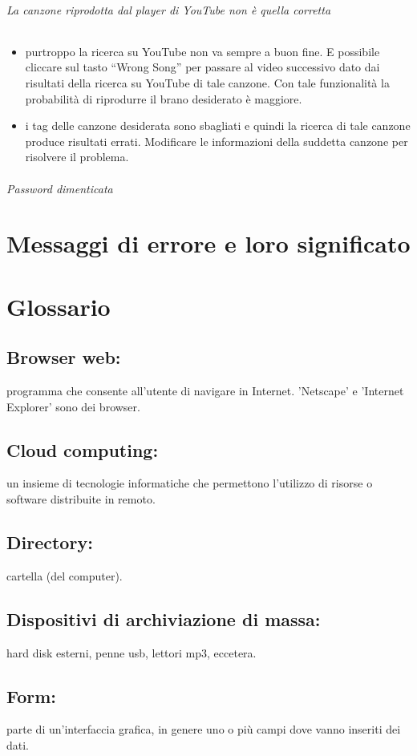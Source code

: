 \subparagraph{La canzone riprodotta dal player di YouTube non \`e quella
corretta}
\begin{itemize}
  \item purtroppo la ricerca su YouTube non va sempre a buon fine. E possibile
  cliccare sul tasto ``Wrong Song'' per passare al video successivo dato dai
  risultati della ricerca su YouTube di tale canzone. Con tale funzionalit\`a la
  probabilit\`a di riprodurre il brano desiderato \`e maggiore.
  \item i tag delle canzone desiderata sono sbagliati e quindi la
  ricerca di tale canzone produce risultati errati. Modificare le informazioni
  della suddetta canzone per risolvere il problema.
\end{itemize}


\subparagraph{Password dimenticata}


\appendix %
\chapter{Messaggi di errore e loro significato}
\thispagestyle{fancy}

\chapter{Glossario}
\thispagestyle{fancy}

\section*{Browser web:} programma che consente all'utente di navigare in
Internet. 'Netscape' e 'Internet Explorer' sono dei browser. 
\section*{Cloud computing:} un insieme di tecnologie informatiche che
permettono l'utilizzo di risorse o software distribuite in remoto.
\section*{Directory:} cartella (del computer).
\section*{Dispositivi di archiviazione di massa:} hard disk esterni, penne
usb, lettori mp3, eccetera.
\section*{Form:} parte di un'interfaccia grafica, in genere uno o pi\`u campi
dove vanno inseriti dei dati. 
